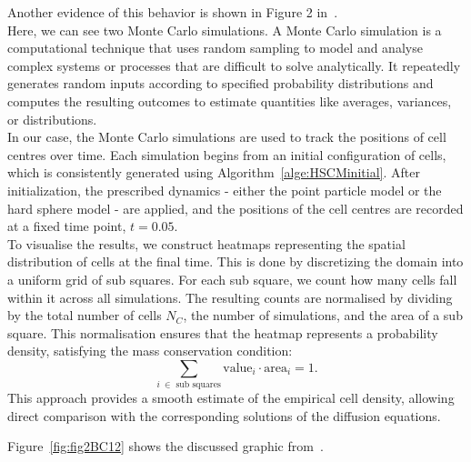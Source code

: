 Another evidence of this behavior is shown in Figure 2 in~\cite{Bruna2012}. \\
Here, we can see two Monte Carlo simulations. 
A Monte Carlo simulation is a computational technique that uses random sampling to model and analyse complex systems or processes that are difficult to solve analytically. 
It repeatedly generates random inputs according to specified probability distributions and computes the resulting outcomes to estimate quantities like averages, variances, or distributions. \\
In our case, the Monte Carlo simulations are used to track the positions of cell centres over time. 
Each simulation begins from an initial configuration of cells, which is consistently generated using Algorithm~\ref{alge:HSCMinitial}. 
After initialization, the prescribed dynamics - either the point particle model or the hard sphere model - are applied, and the positions of the cell centres are recorded at a fixed time point, $t=0.05$. \\
To visualise the results, we construct heatmaps representing the spatial distribution of cells at the final time. 
This is done by discretizing the domain into a uniform grid of sub squares. 
For each sub square, we count how many cells fall within it across all simulations. 
The resulting counts are normalised by dividing by the total number of cells $N_C$, the number of simulations, and the area of a sub square. This normalisation ensures that the heatmap represents a probability density, satisfying the mass conservation condition: \[\sum\limits_{i \: \in \text{ sub squares}} \text{value}_i \cdot \text{area}_i = 1. \]
This approach provides a smooth estimate of the empirical cell density, allowing direct comparison with the corresponding solutions of the diffusion equations.

Figure~\ref{fig:fig2BC12} shows the discussed graphic from~\cite{Bruna2012}. 

